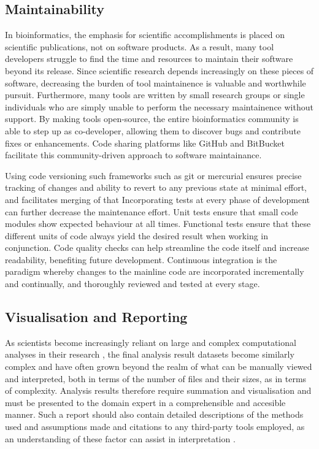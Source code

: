 \subsection{Maintainability}
In bioinformatics, the emphasis for scientific accomplishments is placed on scientific publications, not on software products. As a result, many tool developers struggle to find the time and resources to maintain their software beyond its release. Since scientific research depends increasingly on these pieces of software, decreasing the burden of tool maintainence is valuable and worthwhile pursuit. Furthermore, many tools are written by small research groups or single individuals who are simply unable to perform the necessary maintainence without support. By making tools open-source, the entire bioinformatics community is able to step up as co-developer, allowing them to discover bugs and contribute fixes or enhancements. Code sharing platforms like GitHub \cite{} and BitBucket \cite{} facilitate this community-driven approach to software maintainance.

Using code versioning such frameworks such as git \cite{} or mercurial \cite{} ensures precise tracking of changes and ability to revert to any previous state at minimal effort, and facilitates merging of that Incorporating tests at every phase of development can further decrease the maintenance effort. Unit tests ensure that small code modules show expected behaviour at all times. Functional tests ensure that these different units of code always yield the desired result when working in conjunction. Code quality checks can help streamline the code itself and increase readability, benefiting future development. Continuous integration is the paradigm whereby changes to the mainline code are incorporated incrementally and continually, and thoroughly reviewed and tested at every stage.


\subsection{Visualisation and Reporting}

As scientists become increasingly reliant on large and complex computational analyses in their research \cite{chen2014big}, the final analysis result datasets become similarly complex and have  often grown beyond the realm of what can be manually viewed and interpreted, both in terms of the number of files and their sizes, as in terms of complexity. Analysis results therefore require summation and visualisation and must be presented to the domain expert in a comprehensible and accesible manner. Such a report should also contain detailed descriptions of the methods used and assumptions made and citations to any third-party tools employed, as an understanding of these factor can assist in interpretation \cite{kumar2007bioinformatics}.

